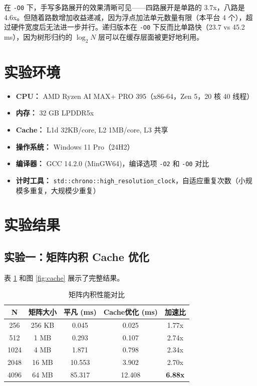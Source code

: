 \documentclass[a4paper]{article}
\begin{document}
在 \texttt{-O0} 下，手写多路展开的效果清晰可见——四路展开是单路的 3.7x，八路是 4.6x。但随着路数增加收益递减，因为浮点加法单元数量有限（本平台 4 个），超过硬件宽度后无法进一步并行。递归版本在 \texttt{-O0} 下反而比单路快（23.7 vs 45.2 ms），因为树形归约的 $\log_2 N$ 层可以在缓存层面被更好地利用。

\section{实验环境}

\begin{itemize}
    \item \textbf{CPU：} AMD Ryzen AI MAX+ PRO 395（x86-64，Zen 5，20 核 40 线程）
    \item \textbf{内存：} 32 GB LPDDR5x
    \item \textbf{Cache：} L1d 32KB/core, L2 1MB/core, L3 共享
    \item \textbf{操作系统：} Windows 11 Pro（24H2）
    \item \textbf{编译器：} GCC 14.2.0 (MinGW64)，编译选项 \texttt{-O2} 和 \texttt{-O0} 对比
    \item \textbf{计时工具：} \texttt{std::chrono::high\_resolution\_clock}，自适应重复次数（小规模多重复，大规模少重复）
\end{itemize}

\section{实验结果}

\subsection{实验一：矩阵内积 Cache 优化}

表 \ref{table:cache} 和图 \ref{fig:cache} 展示了完整结果。

\begin{table}[H]
\centering
\caption{矩阵内积性能对比}
\label{table:cache}
\begin{tabular}{|c|c|c|c|c|}
\hline
N & 矩阵大小 & 平凡 (ms) & Cache优化 (ms) & 加速比 \\
\hline
256 & 256 KB & 0.045 & 0.025 & 1.77x \\
512 & 1 MB & 0.293 & 0.107 & 2.74x \\
1024 & 4 MB & 1.871 & 0.798 & 2.34x \\
2048 & 16 MB & 10.553 & 3.902 & 2.70x \\
4096 & 64 MB & 85.317 & 12.408 & \textbf{6.88x} \\
\hline
\end{tabular}
\end{table}
\end{document}
